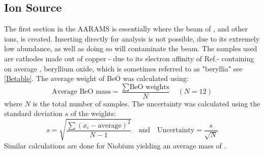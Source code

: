 \subsection{Ion Source}

The first section in the AARAMS is essentially where the beam of , and other ions, is created. Inserting  directly for analysis is not possible, due to its extremely low abundance, as well as doing so will contaminate the beam. The samples used are cathodes made out of copper - due to its electron affinity of  Ref.\cite{web_elements_copper}- containing on average  
, beryllium oxide, which is sometimes referred to as  "beryllia" see \cref{Betable}. 
The average weight of BeO was calculated using:
\begin{equation}
\text{Average BeO mass} = \frac{\sum \text{BeO weights}}{N} \quad (N = 12)
\end{equation}
where \( N \) is the total number of samples.
The uncertainty was calculated using the standard deviation \( s \) of the weights:
\begin{equation}
s = \sqrt{\frac{\sum (x_i - \text{average})^2}{N-1}} \quad \text{and} \quad \text{Uncertainty} = \frac{s}{\sqrt{N}}
\end{equation}
Similar calculations are done for Niobium yielding an average mass of .

